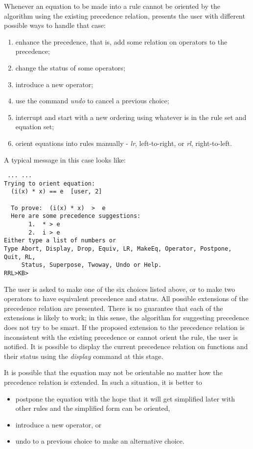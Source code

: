 Whenever an equation to be made into a rule
cannot be oriented by the algorithm using the
existing precedence relation, \RRL presents the
user with different possible ways to handle that case:
\begin{enumerate}
\item enhance the precedence, that is,
add some relation on operators to the precedence; 
\item change the status of some operators; 
\item introduce a new operator;
\item use the command {\em undo} to cancel a previous choice;
\item interrupt and start with a new ordering using 
whatever is in the rule set and equation set;
\item orient equations into rules manually - {\em lr}, left-to-right, 
or {\em rl}, right-to-left.
\end{enumerate}

A typical \RRL message in this case looks like:
\begin{verbatim}
 ... ...
Trying to orient equation: 
  (i(x) * x) == e  [user, 2]

  To prove:  (i(x) * x)  >  e
  Here are some precedence suggestions:
       1.  * > e
       2.  i > e
Either type a list of numbers or
Type Abort, Display, Drop, Equiv, LR, MakeEq, Operator, Postpone, Quit, RL,
     Status, Superpose, Twoway, Undo or Help.
RRL>KB> 
\end{verbatim}
  
The user is asked to make one of the six choices listed above, or to
make two operators to have equivalent precedence and status. All
possible extensions of the precedence relation are presented.  There
is no guarantee that each of the extensions is likely to work; in this
sense, the algorithm for suggesting precedence does not try to be
smart.  If the proposed extension to the precedence relation is
inconsistent with the existing precedence or cannot orient the rule,
the user is notified.  It is possible to display the current
precedence relation on functions and their status using the {\em
display} command at this stage.

It is possible that the equation may not be orientable no matter how
the precedence relation is extended.  In such a situation, it is
better to 
\begin{itemize}
\item postpone the equation with the hope that it will get
simplified later with other rules and the simplified form can be
oriented, 
\item introduce a new operator, or 
\item undo to a previous
choice to make an alternative choice.
\end{itemize}

